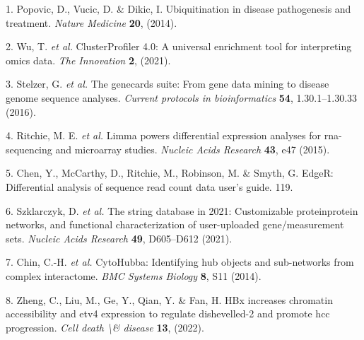 \documentclass[
]{article}
\newenvironment{cslreferences}%
  {}%
  {\par}
\begin{document}
\hypertarget{refs}{}
\begin{cslreferences}
\leavevmode\hypertarget{ref-UbiquitinationPopovi2014}{}%
1. Popovic, D., Vucic, D. \& Dikic, I. Ubiquitination in disease pathogenesis and treatment. \emph{Nature Medicine} \textbf{20}, (2014).

\leavevmode\hypertarget{ref-ClusterprofilerWuTi2021}{}%
2. Wu, T. \emph{et al.} ClusterProfiler 4.0: A universal enrichment tool for interpreting omics data. \emph{The Innovation} \textbf{2}, (2021).

\leavevmode\hypertarget{ref-TheGenecardsSStelze2016}{}%
3. Stelzer, G. \emph{et al.} The genecards suite: From gene data mining to disease genome sequence analyses. \emph{Current protocols in bioinformatics} \textbf{54}, 1.30.1--1.30.33 (2016).

\leavevmode\hypertarget{ref-LimmaPowersDiRitchi2015}{}%
4. Ritchie, M. E. \emph{et al.} Limma powers differential expression analyses for rna-sequencing and microarray studies. \emph{Nucleic Acids Research} \textbf{43}, e47 (2015).

\leavevmode\hypertarget{ref-EdgerDifferenChen}{}%
5. Chen, Y., McCarthy, D., Ritchie, M., Robinson, M. \& Smyth, G. EdgeR: Differential analysis of sequence read count data user's guide. 119.

\leavevmode\hypertarget{ref-TheStringDataSzklar2021}{}%
6. Szklarczyk, D. \emph{et al.} The string database in 2021: Customizable proteinprotein networks, and functional characterization of user-uploaded gene/measurement sets. \emph{Nucleic Acids Research} \textbf{49}, D605--D612 (2021).

\leavevmode\hypertarget{ref-CytohubbaIdenChin2014}{}%
7. Chin, C.-H. \emph{et al.} CytoHubba: Identifying hub objects and sub-networks from complex interactome. \emph{BMC Systems Biology} \textbf{8}, S11 (2014).

\leavevmode\hypertarget{ref-HbxIncreasesCZheng2022}{}%
8. Zheng, C., Liu, M., Ge, Y., Qian, Y. \& Fan, H. HBx increases chromatin accessibility and etv4 expression to regulate dishevelled-2 and promote hcc progression. \emph{Cell death \textbackslash\& disease} \textbf{13}, (2022).
\end{cslreferences}
\end{document}
